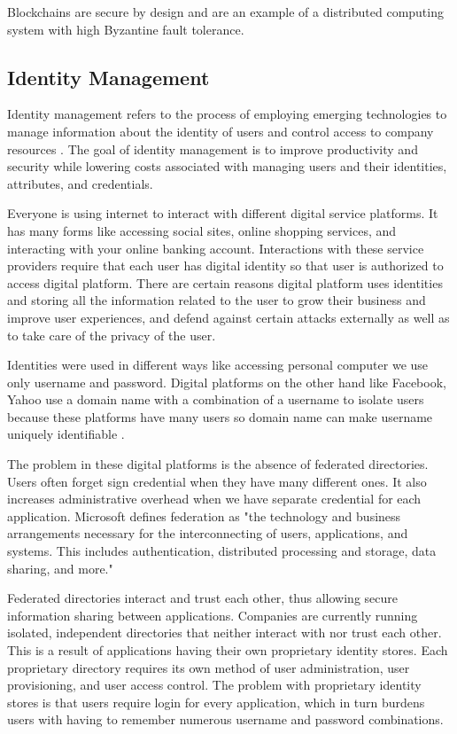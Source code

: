 Blockchains are secure by design and are an example of a distributed computing system with high Byzantine fault tolerance.

\subsection{Identity Management}
Identity management refers to the process of employing emerging technologies to manage information about the identity of users and control access to company resources \cite{IdentityManagement}. The goal of identity management is to improve productivity and security while lowering costs associated with managing users and their identities, attributes, and credentials.

Everyone is using internet to interact with different digital service platforms.
It has many forms like accessing social sites, online shopping services, and interacting with your online banking account. Interactions with these service providers require that each user has digital identity so that user is authorized to access digital platform. There are certain reasons digital platform uses identities and storing all the information related to the user to grow their business and improve user experiences, and defend against certain attacks externally as well as to take care of the privacy of the user.

Identities were used in different ways like accessing personal computer we use only username and password. Digital platforms on the other hand like Facebook, Yahoo use a domain name with a combination of a username to isolate users because these platforms have many users so domain name can make username uniquely identifiable \cite{gondor2016distributed}.

The problem in these digital platforms is the absence of federated directories. Users often forget sign credential when they have many different ones. It also increases administrative overhead when we have separate credential for each application. Microsoft defines federation as "the technology and business arrangements necessary for the interconnecting of users, applications, and systems. This includes
authentication, distributed processing and storage, data sharing, and more." \cite{IdentityManagement}

Federated directories interact and trust each other, thus allowing secure information sharing between applications. Companies are currently running isolated, independent directories that neither interact with nor trust each other.
This is a result of applications having their own proprietary identity stores. Each proprietary directory requires its own method of user administration, user provisioning, and user access control. The problem with proprietary identity stores is that users require login for every application, which in turn burdens users with having to remember numerous username and password combinations.

